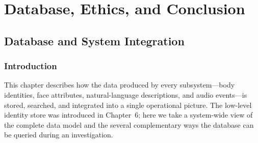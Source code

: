 \documentclass[12pt]{report}
\begin{document}
\newpage

\part{Database, Ethics, and Conclusion}

\chapter{Database and System Integration}
\setcounter{section}{0}

\section{Introduction}
This chapter describes how the data produced by every subsystem---body identities, face attributes, natural-language descriptions, and audio events---is stored, searched, and integrated into a single operational picture. The low-level identity store was introduced in Chapter~6; here we take a system-wide view of the complete data model and the several complementary ways the database can be queried during an investigation.
\end{document}
